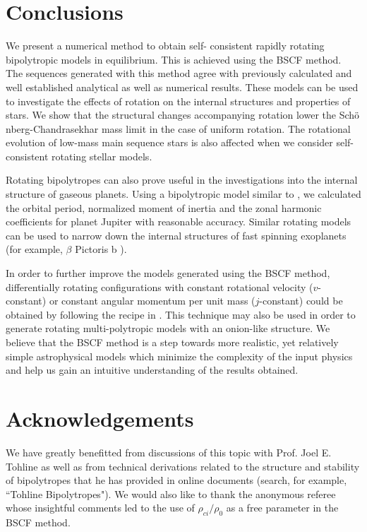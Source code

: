 \documentclass[a4paper,fleqn,usenatbib]{mnras}
\begin{document}
\section{Conclusions }
We present a numerical method to obtain self- consistent rapidly rotating bipolytropic models in equilibrium. This is achieved using the BSCF method. The sequences generated with this method agree with previously calculated and well established analytical as well as numerical results. 
These models can be used to investigate the effects of rotation on the internal structures and properties of stars. We show that the structural changes accompanying rotation lower the Sch$\ddot{\rm{o}}$nberg-Chandrasekhar mass limit in the case of uniform rotation. The rotational evolution of low-mass main sequence stars is also affected when we consider self-consistent rotating stellar models.

Rotating bipolytropes can also prove useful in the investigations into the internal structure of gaseous planets. Using a bipolytropic model similar to \cite{Criss2015}, we calculated the orbital period, normalized moment of inertia and the zonal harmonic coefficients for planet Jupiter with reasonable accuracy. Similar rotating models can be used to narrow down the internal structures of fast spinning exoplanets (for example, $\beta$ Pictoris b  \citep{Snellen2014}). 


In order to further improve the models generated using the BSCF method, differentially rotating configurations with constant rotational velocity ($v$-constant) or constant angular momentum per unit mass ($j$-constant) could be obtained by following the recipe in \cite{Hachisu1986a}. 
This technique may also be used in order to generate rotating multi-polytropic models with an onion-like structure.
We believe that the BSCF method is a step towards more realistic, yet relatively simple astrophysical models which minimize the complexity of the input physics and help us gain an intuitive understanding of the results obtained.  

\section*{Acknowledgements}
We have greatly benefitted from discussions of this topic with Prof. Joel E. Tohline as well as from technical derivations related to the structure and stability of bipolytropes that he has provided in online documents (search, for example, ``Tohline Bipolytropes"). We would also like to thank the anonymous referee whose insightful comments led to the use of $\rho_{ci}/ \rho_0$ as a free parameter in the BSCF method.
\end{document}
